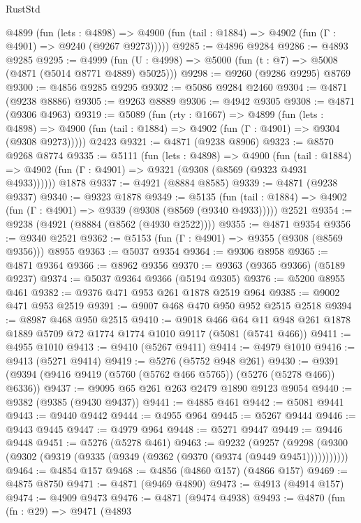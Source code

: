 \begin{lexlean}{RustStd}
\begin{coremodule}
    @4899
      (fun (lets : @4898) =>
      @4900 (fun (tail : @1884) => @4902 (fun (Γ : @4901) => @9240 (@9267 @9273)))))
@9285 := @4896 @9284
@9286 := @4893 @9285
@9295 := @4999 (fun (U : @4998) => @5000 (fun (t : @7) => @5008 (@4871 (@5014 @8771 @4889) @5025)))
@9298 := @9260 (@9286 @9295) @8769
@9300 := @4856 @9285 @9295
@9302 := @5086 @9284 @2460
@9304 := @4871 (@9238 @8886)
@9305 := @9263 @8889
@9306 := @4942 @9305
@9308 := @4871 (@9306 @4963)
@9319 := @5089
    (fun (rty : @1667) =>
    @4899
      (fun (lets : @4898) =>
      @4900 (fun (tail : @1884) => @4902 (fun (Γ : @4901) => @9304 (@9308 @9273)))))
    @2423
@9321 := @4871 (@9238 @8906)
@9323 := @8570 @9268 @8774
@9335 := @5111
    (fun (lets : @4898) =>
    @4900
      (fun (tail : @1884) => @4902 (fun (Γ : @4901) => @9321 (@9308 (@8569 (@9323 @4931 @4933))))))
    @1878
@9337 := @4921 (@8884 @8585)
@9339 := @4871 (@9238 @9337)
@9340 := @9323 @1878
@9349 := @5135
    (fun (tail : @1884) => @4902 (fun (Γ : @4901) => @9339 (@9308 (@8569 (@9340 @4933)))))
    @2521
@9354 := @9238 (@4921 (@8884 (@8562 (@4930 @2522))))
@9355 := @4871 @9354
@9356 := @9340 @2521
@9362 := @5153 (fun (Γ : @4901) => @9355 (@9308 (@8569 @9356))) @8955
@9363 := @5037 @9354
@9364 := @9306 @8958
@9365 := @4871 @9364
@9366 := @8962 @9356
@9370 := @9363 (@9365 @9366) (@5189 @9237)
@9374 := @5037 @9364 @9366 (@5194 @9305)
@9376 := @5200 @8955 @461
@9382 := @9376 @471 @953 @261 @1878 @2519 @964
@9385 := @9002 @471 @953 @2519
@9391 := @9007 @468 @470 @950 @952 @2515 @2518
@9394 := @8987 @468 @950 @2515
@9410 := @9018
    @466
    @64
    @11
    @948
    @261
    @1878
    @1889
    @5709
    @72
    @1774
    @1774
    @1010
    @9117
    (@5081 (@5741 @466))
@9411 := @4955 @1010
@9413 := @9410 (@5267 @9411)
@9414 := @4979 @1010
@9416 := @9413 (@5271 @9414)
@9419 := @5276 (@5752 @948 @261)
@9430 := @9391 (@9394 (@9416 @9419 (@5760 (@5762 @466 @5765)) (@5276 (@5278 @466)) @6336))
@9437 := @9095 @65 @261 @263 @2479 @1890 @9123 @9054
@9440 := @9382 (@9385 (@9430 @9437))
@9441 := @4885 @461
@9442 := @5081 @9441
@9443 := @9440 @9442
@9444 := @4955 @964
@9445 := @5267 @9444
@9446 := @9443 @9445
@9447 := @4979 @964
@9448 := @5271 @9447
@9449 := @9446 @9448
@9451 := @5276 (@5278 @461)
@9463 := @9232
    (@9257 (@9298 (@9300 (@9302 (@9319 (@9335 (@9349 (@9362 (@9370 (@9374 (@9449 @9451)))))))))))
@9464 := @4854 @157
@9468 := @4856 (@4860 @157) (@4866 @157)
@9469 := @4875 @8750
@9471 := @4871 (@9469 @4890)
@9473 := @4913 (@4914 @157)
@9474 := @4909 @9473
@9476 := @4871 (@9474 @4938)
@9493 := @4870
    (fun (fn : @29) =>
    @9471
      (@4893

\end{coremodule}
\end{lexlean}
